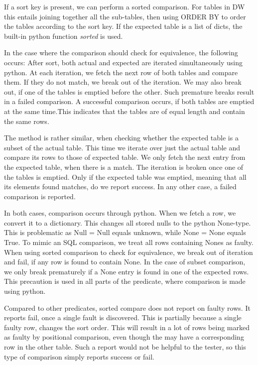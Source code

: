 If a sort key is present, we can perform a sorted comparison. For tables in DW this entails joining together all the sub-tables, then using ORDER BY to order the tables according to the sort key. If the expected table is a list of dicts, the built-in python function \textit{sorted} is used.


In the case where the comparison should check for equivalence, the following occurs: After sort, both actual and expected are iterated simultaneously using python. At each iteration, we fetch the next row of both tables and compare them. If they do not match, we break out of the iteration. We may also break out, if one of the tables is emptied before the other. Such premature breaks result in a failed comparison. A successful comparison occurs, if both tables are emptied at the same time.This indicates that the tables are of equal length and contain the same rows.

The method is rather similar, when checking whether the expected table is a subset of the actual table. This time we iterate over just the actual table and compare its rows to those of expected table. We only fetch the next entry from the expected table, when there is a match. The iteration is broken once one of the tables is emptied. Only if the expected table was emptied, meaning that all its elements found matches, do we report success. In any other case, a failed comparison is reported.

In both cases, comparison occurs through python. When we fetch a row, we convert it to a dictionary. This changes all stored nulls to the python None-type. This is problematic as Null = Null equals unknown, while None = None equals True. To mimic an SQL comparison, we treat all rows containing Nones as faulty. When using sorted comparison to check for equivalence, we break out of iteration and fail, if any row is found to contain None. In the case of subset comparison, we only break prematurely if a None entry is found in one of the expected rows. This precaution is used in all parts of the predicate, where comparison is made using python.

Compared to other predicates, sorted compare does not report on faulty rows. It reports fail, once a single fault is discovered. This is partially because a single faulty row, changes the sort order. This will result in a lot of rows being marked as faulty by positional comparison, even though the may have a corresponding row in the other table. Such a report would not be helpful to the tester, so this type of comparison simply reports success or fail.

